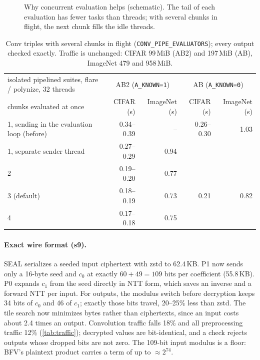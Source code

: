 \documentclass[10pt,a4paper]{article}
\newcommand{\flag}[1]{\nolinkurl{#1}}
\begin{document}
\begin{figure}[t]
  \centering
  \caption{Why concurrent evaluation helps (schematic). The tail of each evaluation has fewer tasks than threads; with
  several chunks in flight, the next chunk fills the idle threads.}
  \label{fig:concurrent}
\end{figure}

\begin{table}[t]
\centering\small
\begin{tabular}{@{}lrrrr@{}}
\toprule
isolated pipelined suites, flare / polynize, 32 threads & \multicolumn{2}{c}{AB2 (\flag{A_KNOWN=1})} & \multicolumn{2}{c}{AB (\flag{A_KNOWN=0})}\\
chunks evaluated at once & CIFAR (s) & ImageNet (s) & CIFAR (s) & ImageNet (s)\\
\midrule
1, sending in the evaluation loop (before) & 0.34--0.39 & -- & 0.26--0.30 & 1.03\\
1, separate sender thread & 0.27--0.29 & 0.94 & & \\
2 & 0.19--0.20 & 0.77 & & \\
3 (default) & 0.18--0.19 & 0.73 & 0.21 & 0.82\\
4 & 0.17--0.18 & 0.75 & & \\
\bottomrule
\end{tabular}
\caption{Conv triples with several chunks in flight (\flag{CONV_PIPE_EVALUATORS}); every output checked exactly. Traffic
is unchanged: CIFAR 99\,MiB (AB2) and 197\,MiB (AB), ImageNet 479 and 958\,MiB.}
\label{tab:concurrent}
\end{table}

\paragraph{Exact wire format (s9).} SEAL serializes a seeded input ciphertext with zstd to 62.4\,KB. P1
now sends only a 16-byte seed and $c_0$ at exactly $60+49=109$ bits per coefficient (55.8\,KB). P0
expands $c_1$ from the seed directly in NTT form, which saves an inverse and a forward NTT per input. For
outputs, the modulus switch before decryption keeps 34 bits of $c_0$ and 46 of $c_1$; exactly those bits
travel, 20--25\% less than zstd. The tile search now minimizes bytes rather than ciphertexts, since an
input costs about 2.4 times an output. Convolution traffic falls 18\% and all preprocessing traffic 12\%
(\cref{tab:traffic}); decrypted values are bit-identical, and a check rejects outputs whose dropped bits are
not zero. The 109-bit input modulus is a floor: BFV's plaintext product carries a term of up to
${\approx}2^{74}$.
\end{document}
